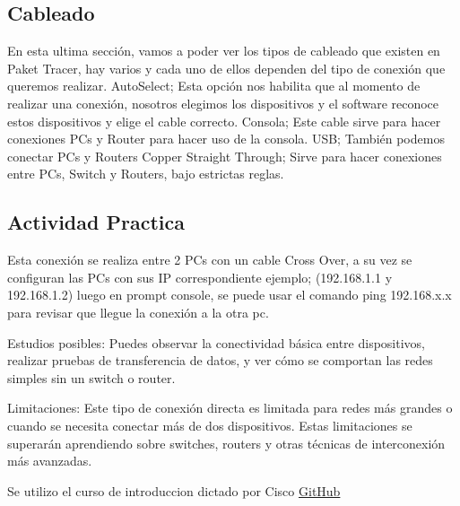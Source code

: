 \documentclass{article}
\begin{document}
\subsection{Cableado}
En esta ultima sección, vamos a poder ver los tipos de cableado que existen en Paket Tracer, hay varios y cada uno de ellos dependen del tipo de conexión que queremos realizar.
AutoSelect; Esta opción nos habilita que al momento de realizar una conexión, nosotros elegimos los dispositivos y el software reconoce estos dispositivos y elige el cable correcto.
Consola; Este cable sirve para hacer conexiones PCs y Router para hacer uso de la consola.
USB; También podemos conectar PCs y Routers
Copper Straight Through; Sirve para hacer conexiones entre PCs, Switch y Routers, bajo estrictas reglas.
\subsection{Actividad Practica}
Esta conexión se realiza entre 2 PCs con un cable Cross Over, a su vez se configuran las PCs con sus IP correspondiente ejemplo; (192.168.1.1 y 192.168.1.2) luego en prompt console, se puede usar el comando ping 192.168.x.x para revisar que llegue la conexión a la otra pc.

Estudios posibles: Puedes observar la conectividad básica entre dispositivos, realizar pruebas de transferencia de datos, y ver cómo se comportan las redes simples sin un switch o router.

Limitaciones: Este tipo de conexión directa es limitada para redes más grandes o cuando se necesita conectar más de dos dispositivos. Estas limitaciones se superarán aprendiendo sobre switches, routers y otras técnicas de interconexión más avanzadas.



Se utilizo el curso de introduccion dictado por Cisco
\href{https://github.com/lionelcutrocs}{GitHub}
\end{document}
